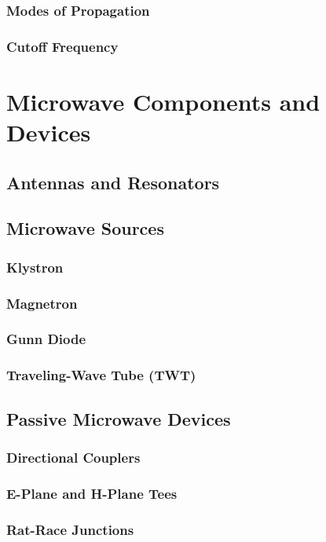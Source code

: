 \documentclass[11pt]{article}
\begin{document}
\subsubsection{Modes of Propagation}
\subsubsection{Cutoff Frequency}

\section{Microwave Components and Devices} \label{sec:microwave_components}
\subsection{Antennas and Resonators} \label{subsec:antennas_resonators}
\subsection{Microwave Sources} \label{subsec:microwave_sources}
\subsubsection{Klystron}
\subsubsection{Magnetron}
\subsubsection{Gunn Diode}
\subsubsection{Traveling-Wave Tube (TWT)}
\subsection{Passive Microwave Devices} \label{subsec:passive_microwave}
\subsubsection{Directional Couplers}
\subsubsection{E-Plane and H-Plane Tees}
\subsubsection{Rat-Race Junctions}
\end{document}

